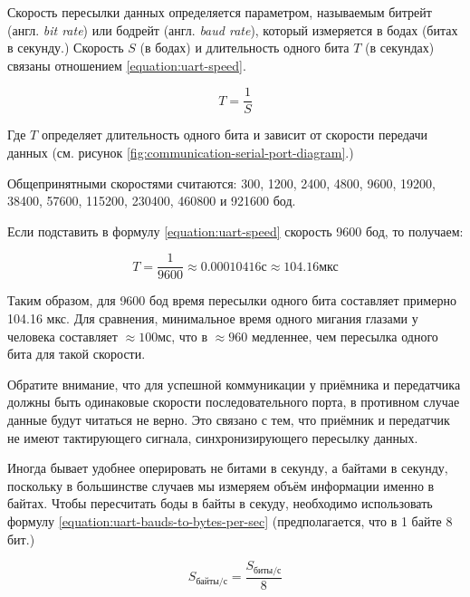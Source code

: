 \documentclass[../sparc.tex]{subfiles}
\begin{document}
Скорость пересылки данных определяется параметром, называемым битрейт
(англ. \emph{bit rate}) или бодрейт (англ. \emph{baud rate}), который измеряется
в бодах (битах в секунду.)  Скорость $S$ (в бодах) и длительность одного бита
$T$ (в секундах) связаны отношением \ref{equation:uart-speed}.

\begin{equation}
  T = \frac{1}{S}
  \label{equation:uart-speed}
\end{equation}

Где $T$ определяет длительность одного бита и зависит от скорости передачи
данных (см. рисунок \ref{fig:communication-serial-port-diagram}.)

Общепринятными скоростями считаются: 300, 1200, 2400, 4800, 9600, 19200, 38400,
57600, 115200, 230400, 460800 и 921600 бод.

Если подставить в формулу \ref{equation:uart-speed} скорость 9600 бод, то получаем:

\begin{equation}
  T = \frac{1}{9600} \approx 0.00010416 \mbox{с} \approx 104.16 \mbox{мкс}
\end{equation}

Таким образом, для 9600 бод время пересылки одного бита составляет примерно
104.16 мкс.  Для сравнения, минимальное время одного мигания глазами у человека
составляет $\approx100 \mbox{мс}$\cite{chudler}, что в $\approx960$ медленнее,
чем пересылка одного бита для такой скорости.

Обратите внимание, что для успешной коммуникации у приёмника и передатчика
должны быть одинаковые скорости последовательного порта, в противном случае
данные будут читаться не верно.  Это связано с тем, что приёмник и передатчик не
имеют тактирующего сигнала, синхронизирующего пересылку данных.

Иногда бывает удобнее оперировать не битами в секунду, а байтами в секунду,
поскольку в большинстве случаев мы измеряем объём информации именно в байтах.
Чтобы пересчитать боды в байты в секуду, необходимо использовать формулу
\ref{equation:uart-bauds-to-bytes-per-sec} (предполагается, что в 1 байте 8
бит.)

\begin{equation}
  S_{\mbox{байты/с}} = \frac{S_{\mbox{биты/с}}}{8}
  \label{equation:uart-bauds-to-bytes-per-sec}
\end{equation}
\end{document}
